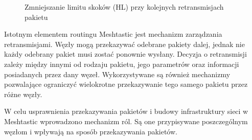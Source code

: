 \documentclass[12pt,a4paper,twoside]{report}
\theoremstyle{definition} %
\begin{document}
    \begin{figure}[ht]
    \centering
    
    \caption{Zmniejszanie limitu skoków (HL) przy kolejnych retransmisjach pakietu}
    \label{rys:hop_limit}
    \end{figure}
    
    Istotnym elementem routingu Meshtastic jest mechanizm zarządzania retransmisjami. Węzły mogą przekazywać odebrane pakiety dalej, jednak nie każdy odebrany pakiet musi zostać ponownie wysłany. Decyzja o retransmisji zależy między innymi od rodzaju pakietu, jego parametrów oraz informacji posiadanych przez dany węzeł. Wykorzystywane są również mechanizmy pozwalające ograniczyć wielokrotne przekazywanie tego samego pakietu przez różne węzły.
    
    W celu usprawnienia przekazywania pakietów i budowy infrastruktury sieci w Meshtastic wprowadzono mechanizm ról. Są one przypisywane poszczególnym węzłom i wpływają na sposób przekazywania pakietów.
\end{document}
